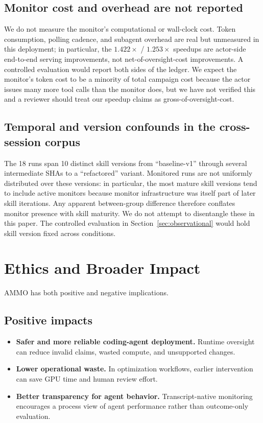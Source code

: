\documentclass[11pt]{article}
\begin{document}
\subsection{Monitor cost and overhead are not reported}
\label{sec:cost}

We do not measure the monitor's computational or wall-clock cost. Token consumption, polling cadence, and subagent overhead are real but unmeasured in this deployment; in particular, the $1.422\times$ / $1.253\times$ speedups are actor-side end-to-end serving improvements, not net-of-oversight-cost improvements. A controlled evaluation would report both sides of the ledger. We expect the monitor's token cost to be a minority of total campaign cost because the actor issues many more tool calls than the monitor does, but we have not verified this and a reviewer should treat our speedup claims as gross-of-oversight-cost.

\subsection{Temporal and version confounds in the cross-session corpus}
\label{sec:version-drift}

The 18 runs span 10 distinct skill versions from ``baseline-v1'' through several intermediate SHAs to a ``refactored'' variant. Monitored runs are not uniformly distributed over these versions: in particular, the most mature skill versions tend to include active monitors because monitor infrastructure was itself part of later skill iterations. Any apparent between-group difference therefore conflates monitor presence with skill maturity. We do not attempt to disentangle these in this paper. The controlled evaluation in Section~\ref{sec:observational} would hold skill version fixed across conditions.

\section{Ethics and Broader Impact}

AMMO has both positive and negative implications.

\subsection{Positive impacts}

\begin{itemize}[leftmargin=*,itemsep=2pt]
  \item \textbf{Safer and more reliable coding-agent deployment.} Runtime oversight can reduce invalid claims, wasted compute, and unsupported changes.
  \item \textbf{Lower operational waste.} In optimization workflows, earlier intervention can save GPU time and human review effort.
  \item \textbf{Better transparency for agent behavior.} Transcript-native monitoring encourages a process view of agent performance rather than outcome-only evaluation.
\end{itemize}
\end{document}
